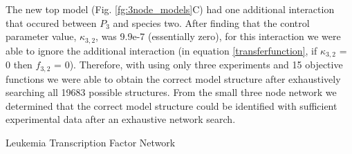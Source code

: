 \documentclass[12pt]{article}
\makeatletter
\renewcommand\subsection{\@startsection
	{subsection}{2}{0mm}
	{-0.05in}
	{-0.5\baselineskip}
	{\normalfont\normalsize\bfseries}}
\makeatother
\begin{document}
The new top model (Fig. \ref{fg:3node_models}C) had one additional interaction that occured between $P_{3}$ and species two. 
After finding that the control parameter value, $\kappa_{3,2}$, was 9.9e-7 (essentially zero), for this interaction we were able to ignore the additional interaction (in equation \ref{transferfunction}, if $\kappa_{3,2}$ = 0 then $f_{3,2}$ = 0). 
Therefore, with using only three experiments and 15 objective functions we were able to obtain the correct model structure after exhaustively searching all 19683 possible structures.
From the small three node network we determined that the correct model structure could be identified with sufficient experimental data after an exhaustive network search.

\subsection{Leukemia Transcription Factor Network}
\end{document}
